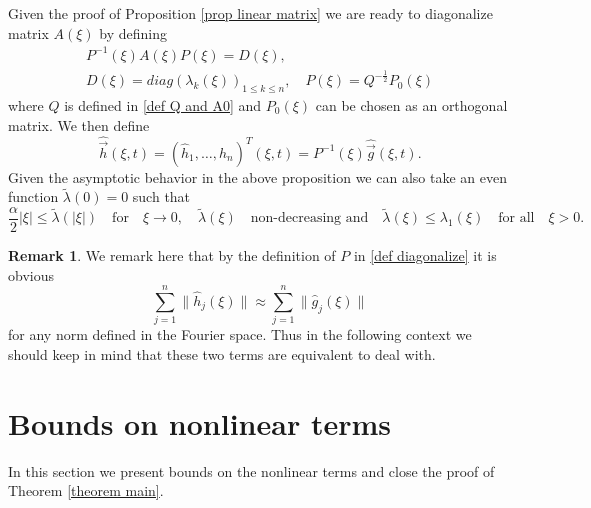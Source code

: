 \documentclass[11pt]{article}
\newcommand{\tla}{\tilde{\lambda}}
\theoremstyle{definition}
\newtheorem{remark}{Remark}[section]
\numberwithin{equation}{section}
\begin{document}
Given the proof of Proposition \ref{prop linear matrix} we are ready to diagonalize matrix $A(\xi)$ by defining
\begin{gather}\label{def diagonalize}
    P^{-1}(\xi)A(\xi)P(\xi)=D(\xi),\\
    D(\xi)=diag(\lambda_k(\xi))_{1\leq k\leq n},\quad P(\xi)=Q^{-\frac{1}{2}}P_0(\xi)
\end{gather}
where $Q$ is defined in \eqref{def Q and A0} and $P_0(\xi)$ can be chosen as an orthogonal matrix. We then define
\begin{equation}\label{def h}
    \widehat{\vec{h}}(\xi,t)=(\hat{h}_1,\dots,\hat{h}_n)^T(\xi,t)=P^{-1}(\xi)\widehat{\vec{g}}(\xi,t).
\end{equation}
Given the asymptotic behavior in the above proposition we can also take an even function $\tla(0)=0$ such that
\begin{equation}\label{def tilde lambda}
    \frac{\alpha}{2}|\xi|\leq\tla(|\xi|)\quad \text{for}\quad \xi\rightarrow0,\quad \tla(\xi)\quad\text{non-decreasing and}\quad \tla(\xi)\leq\lambda_1(\xi) \quad \text{for all}\quad \xi>0.
\end{equation}
\begin{remark}\label{remark gh}
    We remark here that by the definition of $P$ in \eqref{def diagonalize} it is obvious
\begin{equation}
    \sum_{j=1}^n\|\hat{h}_j(\xi)\|\approx\sum_{j=1}^n\|\hat{g}_j(\xi)\|
\end{equation}
for any norm defined in the Fourier space. Thus in the following context we should keep in mind that these two terms are equivalent to deal with.
\end{remark}

\section{Bounds on nonlinear terms}\label{Sec nonlinear}
In this section we present bounds on the  nonlinear terms and close the proof of Theorem \ref{theorem main}.
\end{document}
